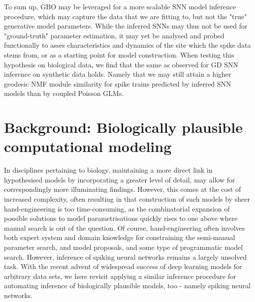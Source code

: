 \documentclass[mphil,deptreport,ianc]{infthesis} %
\begin{document}
To sum up,
GBO may be leveraged for a more scalable SNN model inference procedure, which may capture the data that we are fitting to, but not the "true" generative model parameters.
While the inferred SNNs may thus not be used for "ground-truth" parameter estimation, it may yet be analysed and probed functionally to asses characteristics and dynamics of the site which the spike data stems from, or as a starting point for model construction.
When testing this hypothesis on biological data, we find that the same as observed for GD SNN inference on synthetic data holds. Namely that we may still attain a higher geodesic NMF module similarity for spike trains predicted by inferred SNN models than by coupled Poisson GLMs.


\chapter{Background: Biologically plausible computational modeling}\label{chpt:background}

In disciplines pertaining to biology, maintaining a more direct link in hypothesised models by incorporating a greater level of detail, may allow for correspondingly more illuminating findings.
However, this comes at the cost of increased complexity, often resulting in that construction of such models by sheer hand-engineering is too time-consuming, as the combinatorial expansion of possible solutions to model parametrisations quickly rises to one above where manual search is out of the question.
Of course, hand-engineering often involves both expert system and domain knowledge for constraining the semi-manual parameter search, and model proposals, and some type of programmatic model search.
However, inference of spiking neural networks remains a largely unsolved task.
With the recent advent of widespread success of deep learning models for arbitrary data sets, we here revisit applying a similar inference procedure for automating inference of biologically plausible models, too - namely spiking neural networks.
\end{document}
